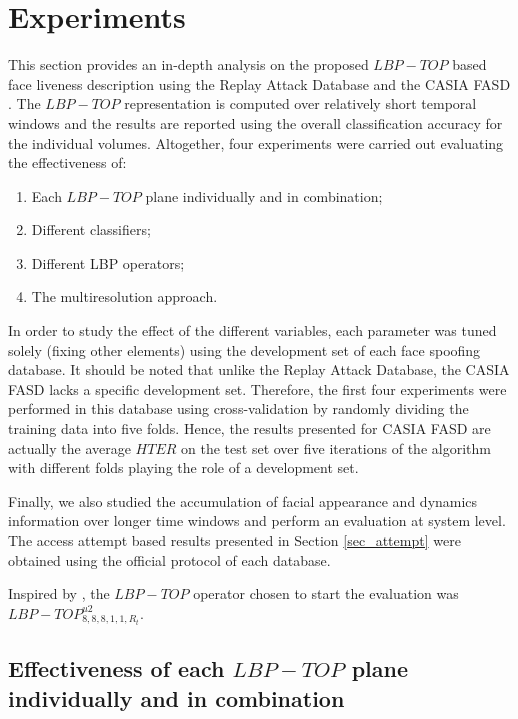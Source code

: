 \section{Experiments}
\label{sec_experiments}

This section provides an in-depth analysis on the proposed $LBP-TOP$ based face liveness description using the Replay Attack Database \citep{ChingovskaBIOSIG2012} and the CASIA FASD \citep{zhangface}. The $LBP-TOP$ representation is computed over relatively short temporal windows and the results are reported using the overall classification accuracy for the individual volumes. Altogether, four experiments were carried out evaluating the effectiveness of:

\begin{enumerate}
        \item Each $LBP-TOP$ plane individually and in combination;
        \item Different classifiers;
        \item Different LBP operators;
        \item The multiresolution approach.
\end{enumerate}

In order to study the effect of the different variables, each parameter was tuned solely (fixing other elements) using the development set of each face spoofing database. It should be noted that unlike the Replay Attack Database, the CASIA FASD lacks a specific development set. Therefore, the first four experiments were performed in this database using cross-validation by randomly dividing the training data into five folds. Hence, the results presented for CASIA FASD are actually the average $HTER$ on the test set over five iterations of the algorithm with different folds playing the role of a development set.

Finally, we also studied the accumulation of facial appearance and dynamics information over longer time windows and perform an evaluation at system level. The access attempt based results presented in Section \ref{sec_attempt} were obtained using the official protocol of each database.

Inspired by \cite{ChingovskaBIOSIG2012}, the $LBP-TOP$ operator chosen to start the evaluation was $LBP-TOP_{8,8,8,1,1,R_{t}}^{u2}$. 

\subsection{Effectiveness of each $LBP-TOP$ plane individually and in combination}
\label{sec_lbptop_planes}

